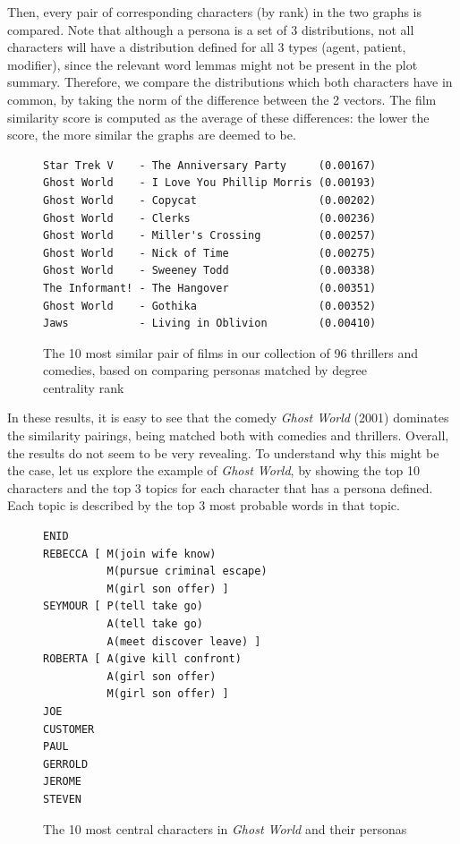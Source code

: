 \documentclass[bsc,frontabs,singlespacing,parskip, twoside]{infthesis}
\begin{document}
Then, every pair of corresponding characters (by rank) in the two graphs is compared. Note that although a persona is a set of 3 distributions, not all characters will have a distribution defined for all 3 types (agent, patient, modifier), since the relevant word lemmas might not be present in the plot summary. Therefore, we compare the distributions which both characters have in common, by taking the norm of the difference between the 2 vectors. The film similarity score is computed as the average of these differences: the lower the score, the more similar the graphs are deemed to be.

\begin{figure}[h]
\centering
\begin{minipage}{11.5cm}
\begin{Verbatim}[frame=single]
Star Trek V    - The Anniversary Party     (0.00167)
Ghost World    - I Love You Phillip Morris (0.00193)
Ghost World    - Copycat                   (0.00202)
Ghost World    - Clerks                    (0.00236)
Ghost World    - Miller's Crossing         (0.00257)
Ghost World    - Nick of Time              (0.00275)
Ghost World    - Sweeney Todd              (0.00338)
The Informant! - The Hangover              (0.00351)
Ghost World    - Gothika                   (0.00352)
Jaws           - Living in Oblivion        (0.00410)
\end{Verbatim}
\end{minipage}
\caption{The 10 most similar pair of films in our collection of 96 thrillers and comedies, based on comparing personas matched by degree centrality rank}
\end{figure}

In these results, it is easy to see that the comedy \textit{Ghost World} (2001) dominates the similarity pairings, being matched both with comedies and thrillers. Overall, the results do not seem to be very revealing. To understand why this might be the case, let us explore the example of \textit{Ghost World}, by showing the top 10 characters and the top 3 topics for each character that has a persona defined. Each topic is described by the top 3 most probable words in that topic.

\begin{figure}[h]
\centering
\begin{minipage}{9cm}
\begin{Verbatim}[frame=single]
ENID 
REBECCA [ M(join wife know)
          M(pursue criminal escape)
          M(girl son offer) ]
SEYMOUR [ P(tell take go)
          A(tell take go)
          A(meet discover leave) ]
ROBERTA [ A(give kill confront)
          A(girl son offer)
          M(girl son offer) ]
JOE 
CUSTOMER 
PAUL 
GERROLD 
JEROME 
STEVEN 
\end{Verbatim}

\end{minipage}
\caption{The 10 most central characters in \textit{Ghost World} and their personas}
\end{figure}
\end{document}
